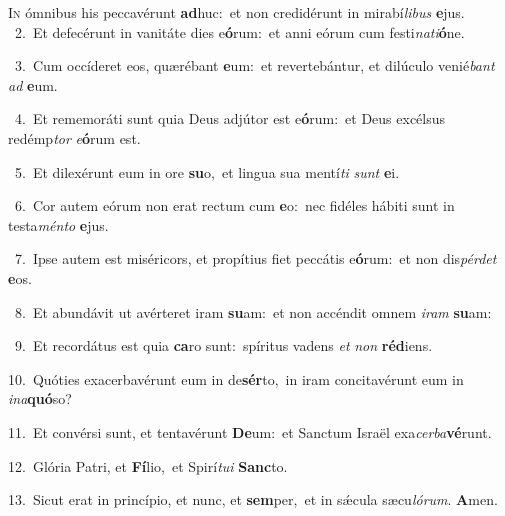 \lettrine{\initial\textcolor{\initialcolor}{I}}{n} ómnibus his peccavérunt \textbf{ad}\-huc:~\star et non credidérunt in mirabí\-\textit{li}\-\textit{bus} \textbf{e}\-jus.\\
{\numbfont\textcolor{\numbcolor}{~2.}}~Et defecérunt in vanitáte dies e\-\textbf{ó}\-rum:~\star et anni eórum cum festi\-\textit{na}\-\textit{ti}\textbf{ó}ne.\par
{\numbfont\textcolor{\numbcolor}{~3.}}~Cum occíderet eos, quærébant \textbf{e}\-um:~\star et revertebántur, et dilúculo venié\textit{bant} \textit{ad} \textbf{e}\-um.\par
{\numbfont\textcolor{\numbcolor}{~4.}}~Et rememoráti sunt quia Deus adjútor est e\-\textbf{ó}\-rum:~\star et Deus excélsus redémp\textit{tor} \textit{e}\-\textbf{ó}rum est.\par
{\numbfont\textcolor{\numbcolor}{~5.}}~Et dilexérunt eum in ore \textbf{su}\-o,~\star et lingua sua mentí\textit{ti} \textit{sunt} \textbf{e}\-i.\par
{\numbfont\textcolor{\numbcolor}{~6.}}~Cor autem eórum non erat rectum cum \textbf{e}\-o:~\star nec fidéles hábiti sunt in testa\-\textit{mén}\-\textit{to} \textbf{e}\-jus.\par
{\numbfont\textcolor{\numbcolor}{~7.}}~Ipse autem est miséricors, et propítius fiet peccátis e\-\textbf{ó}\-rum:~\star et non dis\-\textit{pér}\-\textit{det} \textbf{e}\-os.\par
{\numbfont\textcolor{\numbcolor}{~8.}}~Et abundávit ut avérteret iram \textbf{su}\-am:~\star et non accéndit omnem \textit{i}\-\textit{ram} \textbf{su}\-am:\par
{\numbfont\textcolor{\numbcolor}{~9.}}~Et recordátus est quia \textbf{ca}\-ro sunt:~\star spíritus vadens \textit{et} \textit{non} \textbf{réd}\-iens.\par
{\numbfont\textcolor{\numbcolor}{10.}}~Quóties exacerbavérunt eum in de\-\textbf{sér}\-to,~\star in iram concitavérunt eum in \textit{in}\-\textit{a}\textbf{quó}so?\par
{\numbfont\textcolor{\numbcolor}{11.}}~Et convérsi sunt, et tentavérunt \textbf{De}\-um:~\star et Sanctum Israël exa\-\textit{cer}\-\textit{ba}\textbf{vé}runt.\par
{\numbfont\textcolor{\numbcolor}{12.}}~Glória Patri, et \textbf{Fí}\-lio,~\star et Spirí\-\textit{tu}\-\textit{i} \textbf{Sanc}\-to.\par
{\numbfont\textcolor{\numbcolor}{13.}}~Sicut erat in princípio, et nunc, et \textbf{sem}\-per,~\star et in sǽcula sæcu\-\textit{ló}\-\textit{rum}. \textbf{A}\-men.\par
